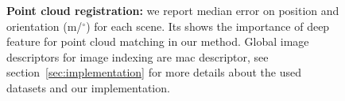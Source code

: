 \begin{figure}
\centering

\begin{minipage}{0.5\linewidth}
\end{minipage}\hfill
\begin{minipage}{0.5\linewidth}

\caption[Point cloud alignement]{\label{tab:methods_comparison}\textbf{Point cloud registration:} we report median error on position and orientation (m/$^{\circ}$) for each scene. Its shows the importance of deep feature for point cloud matching in our method. Global image descriptors for image indexing are \ac{mac} descriptor, see section~\ref{sec:implementation} for more details about the used datasets and our implementation.}
\end{minipage}

\end{figure}